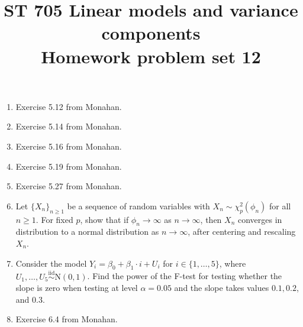 \documentclass[11pt]{article}
\title{ST 705 Linear models and variance components \\ 
        Homework problem set 12}
\begin{document}
\maketitle

\begin{enumerate}



\item Exercise 5.12 from Monahan.

\item Exercise 5.14 from Monahan.

\item Exercise 5.16 from Monahan.

\item Exercise 5.19 from Monahan.

\item Exercise 5.27 from Monahan.

\item Let $\{X_{n}\}_{n\ge1}$ be a sequence of random variables with $X_{n} \sim \chi^{2}_{p}(\phi_{n})$ for all $n \ge 1$.  For fixed $p$, show that if $\phi_{n} \to \infty$ as $n\to\infty$, then $X_{n}$ converges in distribution to a normal distribution as $n\to\infty$, after centering and rescaling $X_{n}$.

\item Consider the model $Y_{i} = \beta_{0} + \beta_{1}\cdot i + U_{i}$ for $i \in \{1,\dots,5\}$, where $U_{1},\dots,U_{5} \overset{\text{iid}}{\sim} \text{N}(0,1)$.  Find the power of the F-test for testing whether the slope is zero when testing at level $\alpha = 0.05$ and the slope takes values $0.1, 0.2$, and $0.3$.

\item Exercise 6.4 from Monahan.


\end{enumerate}
\end{document}
